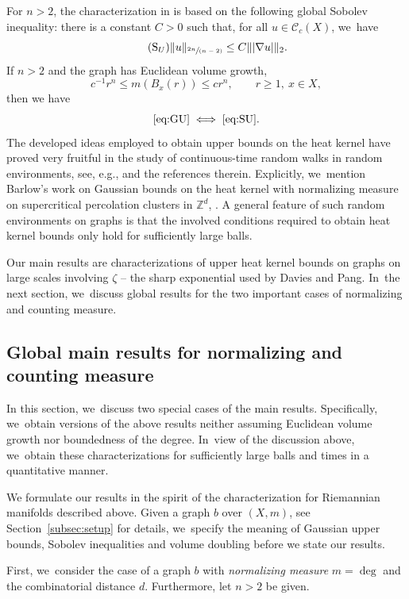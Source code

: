 \documentclass[10pt]{amsart}
\newcommand{\spfrac}[2]{\sfrac{#1}{(#2)}}
\newcommand{\rS}{\mathrm{S}}
\theoremstyle{plain}
\theoremstyle{definition}
\newcommand{\ZZ}{\mathbb{Z}}
\newcommand{\cC}{\mathcal{C}}
\begin{document}
For $n>2$, the characterization in \cite{Barlow-book} is based on the following global Sobolev inequality: there is a constant $C>0$ such that, for all $u\in \cC_c(X)$, we~have
\begin{equation}\tag{$\rS_U$}\label{eq:SU}
\|u\|_{\spfrac{2n}{n-2}}\leq C\||\nabla u|\|_2.
\end{equation}
If $n>2$ and the graph has Euclidean volume growth, \ie
\[
c^{-1}r^n\leq m(B_x(r))\leq c r^n,\qquad r\geq 1,\ x\in X,
\]
then we have
\[
\eqref{eq:GU} \iff \eqref{eq:SU}.
\]
The developed ideas employed to obtain upper bounds on the heat kernel have proved very fruitful in the study of continuous-time random walks in random environments, see, e.g., \cite{AndresDS-16,ChenKW-20,Bella-22} and the references therein. Explicitly, we~mention Barlow's work on Gaussian bounds on the heat kernel with normalizing measure on supercritical percolation clusters in $\ZZ^d$, \cite{Barlow-04}. A general feature of such random environments on graphs is that the involved conditions required to obtain heat kernel bounds only hold for sufficiently large balls.

Our main results are characterizations of upper heat kernel bounds on graphs on large scales involving $\zeta$ -- the sharp exponential used by Davies and Pang. In~the next section, we~discuss global results for the two important cases of normalizing and counting measure.

\subsection{Global main results for normalizing and counting measure}\label{sub:globalmain}
In this section, we~discuss two special cases of the main results.
Specifically, we~obtain versions of the above results neither assuming Euclidean volume growth nor boundedness of the degree. In~view of the discussion above, we~obtain these characterizations for sufficiently large balls and times in a quantitative manner.

We formulate our results in the spirit of the characterization for Riemannian manifolds described above. Given a graph {$ b $ over $ (X,m) $, see Section~\ref{subsec:setup} for details}, we~specify the meaning of Gaussian upper bounds, Sobolev inequalities and volume doubling before we state our results.

First, we~consider the case of a graph {$ b $} with {\it normalizing measure} $m=\deg$ and the combinatorial distance {$ d $. Furthermore, let $n>2$ be given.}
\end{document}
